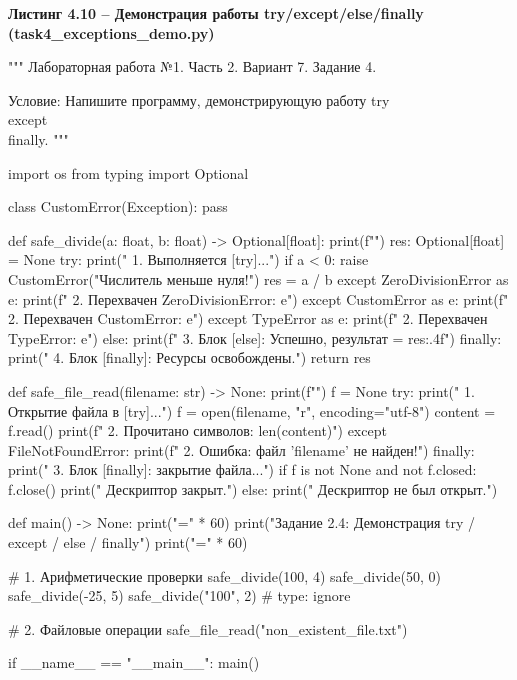 \documentclass[14pt,a4paper]{extarticle}
\newcommand{\listingtitle}[1]{%
  \par\vspace{8pt}%
  \noindent\hspace*{1.25cm}\textbf{#1}\par\vspace{2pt}%
}
\begin{document}
\listingtitle{Листинг 4.10 -- Демонстрация работы try/except/else/finally (task4\_exceptions\_demo.py)}
\begin{CodeListing}
"""
Лабораторная работа №1. Часть 2.
Вариант 7. Задание 4.

Условие:
Напишите программу, демонстрирующую работу try\\except\\finally.
"""

import os
from typing import Optional


class CustomError(Exception):
    pass


def safe_divide(a: float, b: float) -> Optional[float]:
    print(f"")
    res: Optional[float] = None
    try:
        print("  1. Выполняется [try]...")
        if a < 0:
            raise CustomError("Числитель меньше нуля!")
        res = a / b
    except ZeroDivisionError as e:
        print(f"  2. Перехвачен ZeroDivisionError: {e}")
    except CustomError as e:
        print(f"  2. Перехвачен CustomError: {e}")
    except TypeError as e:
        print(f"  2. Перехвачен TypeError: {e}")
    else:
        print(f"  3. Блок [else]: Успешно, результат = {res:.4f}")
    finally:
        print("  4. Блок [finally]: Ресурсы освобождены.")
    return res


def safe_file_read(filename: str) -> None:
    print(f"")
    f = None
    try:
        print("  1. Открытие файла в [try]...")
        f = open(filename, "r", encoding="utf-8")
        content = f.read()
        print(f"  2. Прочитано символов: {len(content)}")
    except FileNotFoundError:
        print(f"  2. Ошибка: файл '{filename}' не найден!")
    finally:
        print("  3. Блок [finally]: закрытие файла...")
        if f is not None and not f.closed:
            f.close()
            print("     Дескриптор закрыт.")
        else:
            print("     Дескриптор не был открыт.")


def main() -> None:
    print("=" * 60)
    print("Задание 2.4: Демонстрация try / except / else / finally")
    print("=" * 60)

    # 1. Арифметические проверки
    safe_divide(100, 4)
    safe_divide(50, 0)
    safe_divide(-25, 5)
    safe_divide("100", 2)  # type: ignore

    # 2. Файловые операции
    safe_file_read("non_existent_file.txt")


if __name__ == "__main__":
    main()
\end{CodeListing}
\end{document}
